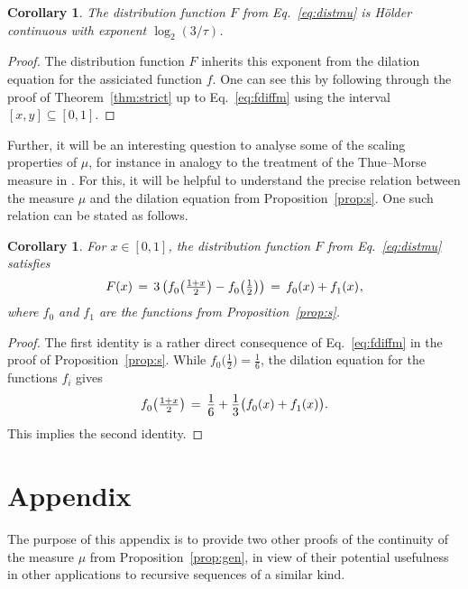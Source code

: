 \documentclass[11pt,a4paper]{amsart}
\theoremstyle{plain}
\newtheorem{coro}[theorem]{Corollary}
\theoremstyle{definition}
\numberwithin{equation}{section}
\newcommand{\ts}{\hspace{0.5pt}}
\newcommand{\myfrac}[2]{\frac{\raisebox{-2pt}{$#1$}}
      {\raisebox{0.5pt}{$#2$}}}
\begin{document}
\begin{coro}\label{coro:holder}
  The distribution function $F$ from Eq.~\eqref{eq:distmu} is
  H\"{o}lder continuous with exponent $\log_2(3/\tau)$.
\end{coro}

\begin{proof} 
  The distribution function $F$ inherits this exponent from the
  dilation equation for the assiciated function $f$. One can see this
  by following through the proof of Theorem~\ref{thm:strict} up to
  Eq.~\eqref{eq:fdiffm} using the interval $[x,y]\subseteq[0,1]$.
\end{proof}

Further, it will be an interesting question to analyse some of the
scaling properties of $\mu$, for instance in analogy to the treatment
of the Thue--Morse measure in \cite{BGN}.  For this, it will be
helpful to understand the precise relation between the measure $\mu$
and the dilation equation from Proposition~\ref{prop:s}. One such
relation can be stated as follows.

\begin{coro}
  For\/ $x\in [0,1]$, the distribution function\/ $F$ from
  Eq.~\eqref{eq:distmu} satisfies
\[
   F (x) \, = \, 3 \left( f^{}_{0} \bigl( \tfrac{1+x}{2} \bigr)
   - f^{}_{0} \bigl( \tfrac{1}{2} \bigr) \right) \, = \,
   f^{}_{0} (x) + f^{}_{1} (x) \ts ,
\]
  where\/ $f^{}_{0}$ and\/ $f^{}_{1}$ are
  the functions from Proposition~\emph{\ref{prop:s}}.
\end{coro}

\begin{proof}
  The first identity is a rather direct consequence of
  Eq.~\eqref{eq:fdiffm} in the proof of Proposition~\ref{prop:s}.
  While $f^{}_{0} \bigl( \frac{1}{2}\bigr) = \frac{1}{6}$, the
  dilation equation for the functions $f_i$ gives
\[
   f^{}_{0} \bigl( \tfrac{1+x}{2} \bigr) \, = \,
   \myfrac{1}{6} + \myfrac{1}{3} \bigl( f^{}_{0} (x)
   + f^{}_{1} (x) \bigr) .
\]
  This implies the second identity.
\end{proof}



\section*{Appendix}

The purpose of this appendix is to provide two other proofs of the
continuity of the measure $\mu$ from Proposition~\ref{prop:gen}, in
view of their potential usefulness in other applications to recursive
sequences of a similar kind. \smallskip
\end{document}
